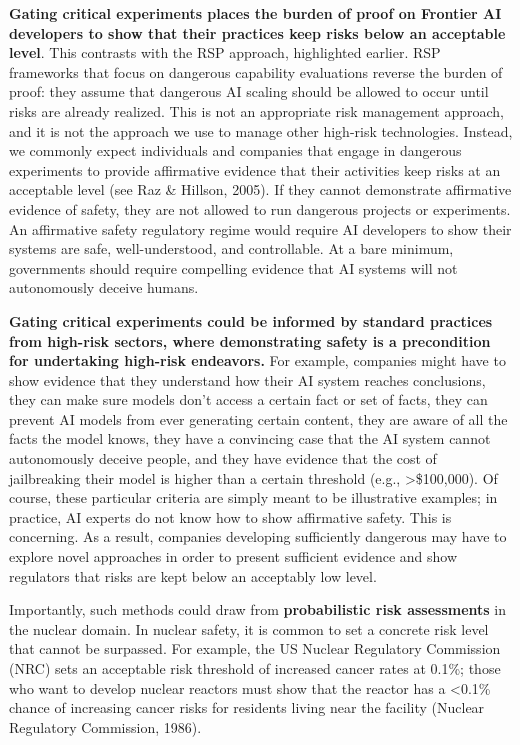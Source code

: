\documentclass[12pt,a4paper]{article}
\begin{document}
\textbf{Gating critical experiments places the burden of proof on Frontier AI developers to show that their practices keep risks below an acceptable level}. This contrasts with the RSP approach, highlighted earlier. RSP frameworks that focus on dangerous capability evaluations reverse the burden of proof: they assume that dangerous AI scaling should be allowed to occur until risks are already realized. This is not an appropriate risk management approach, and it is not the approach we use to manage other high-risk technologies. Instead, we commonly expect individuals and companies that engage in dangerous experiments to provide affirmative evidence that their activities keep risks at an acceptable level (see Raz \& Hillson, 2005). If they cannot demonstrate affirmative evidence of safety, they are not allowed to run dangerous projects or experiments. An affirmative safety regulatory regime would require AI developers to show their systems are safe, well-understood, and controllable. At a bare minimum, governments should require compelling evidence that AI systems will not autonomously deceive humans. 

\textbf{Gating critical experiments could be informed by standard practices from high-risk sectors, where demonstrating safety is a precondition for undertaking high-risk endeavors.} For example, companies might have to show evidence that they understand how their AI system reaches conclusions, they can make sure models don’t access a certain fact or set of facts, they can prevent AI models from ever generating certain content, they are aware of all the facts the model knows, they have a convincing case that the AI system cannot autonomously deceive people, and they have evidence that the cost of jailbreaking their model is higher than a certain threshold (e.g., >\$100,000). Of course, these particular criteria are simply meant to be illustrative examples; in practice, AI experts do not know how to show affirmative safety. This is concerning. As a result, companies developing sufficiently dangerous may have to explore novel approaches in order to present sufficient evidence and show regulators that risks are kept below an acceptably low level.

Importantly, such methods could draw from \textbf{probabilistic risk assessments} in the nuclear domain. In nuclear safety, it is common to set a concrete risk level that cannot be surpassed. For example, the US Nuclear Regulatory Commission (NRC) sets an acceptable risk threshold of increased cancer rates at 0.1\%; those who want to develop nuclear reactors must show that the reactor has a <0.1\% chance of increasing cancer risks for residents living near the facility (Nuclear Regulatory Commission, 1986). 
\end{document}
